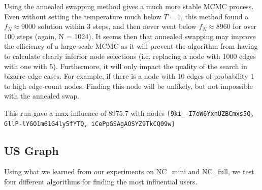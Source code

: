 \documentclass{article}
\begin{document}
	Using the annealed swapping method gives a much more stable MCMC process. Even without setting the temperature much below $T = 1$, this method found a $f_N \approx 9000$ solution within 3 steps, and then never went below $f_N \approx 8960$ for over 100 steps (again, N = 1024). It seems then that annealed swapping may improve the efficiency of a large scale MCMC as it will prevent the algorithm from having to calculate clearly inferior node selections (i.e. replacing a node with 1000 edges with one with 5). Furthermore, it will only impact the quality of the search in bizarre edge cases. For example, if there is a node with 10 edges of probability 1 to high edge-count nodes. Finding this node will be unlikely, but not impossible with the annealed swap.
		
		This run gave a max influence of 8975.7 with nodes
		\texttt{[9ki\_-I7oW6YxnUZBCmxs5Q, GllP-lYGO1m61G4ly5fYTQ, iCePpGSAgAOSYZ9TkCQ09w]}
		
	\subsection{US Graph}
			
			Using what we learned from our experiments on NC\_mini and NC\_full, we test four different algorithms for finding the most influential users.
			
\end{document}
